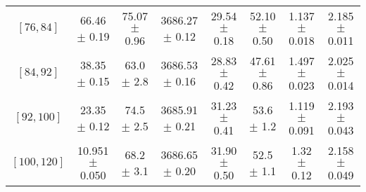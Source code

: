 \begin{tabular}{c||c|c|c|c|c|c|c}
$[76, 84]$ & 66.46 $\pm$ 0.19 & 75.07 $\pm$ 0.96 & 3686.27 $\pm$ 0.12 & 29.54 $\pm$ 0.18 & 52.10 $\pm$ 0.50 & 1.137 $\pm$ 0.018 & 2.185 $\pm$ 0.011\\
$[84, 92]$ & 38.35 $\pm$ 0.15 & 63.0 $\pm$ 2.8 & 3686.53 $\pm$ 0.16 & 28.83 $\pm$ 0.42 & 47.61 $\pm$ 0.86 & 1.497 $\pm$ 0.023 & 2.025 $\pm$ 0.014\\
$[92, 100]$ & 23.35 $\pm$ 0.12 & 74.5 $\pm$ 2.5 & 3685.91 $\pm$ 0.21 & 31.23 $\pm$ 0.41 & 53.6 $\pm$ 1.2 & 1.119 $\pm$ 0.091 & 2.193 $\pm$ 0.043\\
$[100, 120]$ & 10.951 $\pm$ 0.050 & 68.2 $\pm$ 3.1 & 3686.65 $\pm$ 0.20 & 31.90 $\pm$ 0.50 & 52.5 $\pm$ 1.1 & 1.32 $\pm$ 0.12 & 2.158 $\pm$ 0.049\\
\end{tabular}

